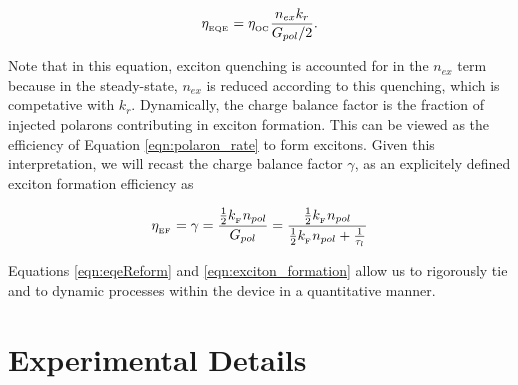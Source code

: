 \documentclass[../thesis.tex]{subfiles}
\begin{document}
\begin{equation}
\eta_{_\text{\tiny EQE}}=\eta_{_\text{\tiny OC}} \frac{n_{ex}k_r}{G_{pol}/2}.
\label{eqn:eqeReform}
\end{equation}

Note that in this equation, exciton quenching is accounted for in the $n_{ex}$ term because in the steady-state, $n_{ex}$ is reduced according to this quenching, which is competative with $k_r$.
Dynamically, the charge balance factor is the fraction of injected polarons contributing in exciton formation.  
This can be viewed as the efficiency of Equation \ref{eqn:polaron_rate} to form excitons.
Given this interpretation, we will recast the charge balance factor $\gamma$, as an explicitely defined exciton formation efficiency \ef as

\begin{equation}
\eta_{_\text{\tiny EF}}=\gamma = \frac{\frac{1}{2}k_{_\text{\tiny F}} n_{pol}}{G_{pol}}=\frac{\frac{1}{2}k_{_\text{\tiny F}} n_{pol}}{\frac{1}{2}k_{_\text{\tiny F}} n_{pol}+\frac{1}{\tau_l}}
\label{eqn:exciton_formation_polarons}
\end{equation}

Equations \ref{eqn:eqeReform} and \ref{eqn:exciton_formation} allow us to rigorously tie \eqe and \ef to dynamic processes within the device in a quantitative manner.

\section{Experimental Details} \label{sec:experimental_details}
\end{document}
